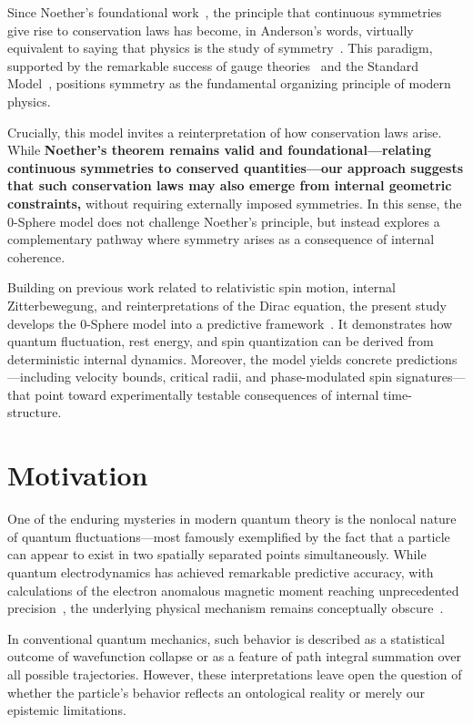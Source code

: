\documentclass[%
 reprint,
 amsmath,amssymb,
 aps,
]{revtex4-1}
\numberwithin{equation}{section}%
\begin{document}
Since Noether's foundational work~\cite{noether1918}, the principle that continuous symmetries give rise to conservation laws has become, in Anderson's words, virtually equivalent to saying that physics is the study of symmetry~\cite{anderson1972}. This paradigm, supported by the remarkable success of gauge theories~\cite{weinberg1996} and the Standard Model~\cite{gross1996}, positions symmetry as the fundamental organizing principle of modern physics.

Crucially, this model invites a reinterpretation of how conservation laws arise. While \textbf{Noether’s theorem remains valid and foundational—relating continuous symmetries to conserved quantities—our approach suggests that such conservation laws may also emerge from internal geometric constraints,} without requiring externally imposed symmetries. In this sense, the 0-Sphere model does not challenge Noether’s principle, but instead explores a complementary pathway where symmetry arises as a consequence of internal coherence.

Building on previous work related to relativistic spin motion, internal Zitterbewegung, and reinterpretations of the Dirac equation, the present study develops the 0-Sphere model into a predictive framework~\cite{barut1981}. It demonstrates how quantum fluctuation, rest energy, and spin quantization can be derived from deterministic internal dynamics. Moreover, the model yields concrete predictions—including velocity bounds, critical radii, and phase-modulated spin signatures—that point toward experimentally testable consequences of internal time-structure.


\section{Motivation}

One of the enduring mysteries in modern quantum theory is the nonlocal nature of quantum fluctuations—most famously exemplified by the fact that a particle can appear to exist in two spatially separated points simultaneously. While quantum electrodynamics has achieved remarkable predictive accuracy, with calculations of the electron anomalous magnetic moment reaching unprecedented precision~\cite{aoyama2015}, the underlying physical mechanism remains conceptually obscure~\cite{ballentine1998}.

In conventional quantum mechanics, such behavior is described as a statistical outcome of wavefunction collapse or as a feature of path integral summation over all possible trajectories. However, these interpretations leave open the question of whether the particle's behavior reflects an ontological reality or merely our epistemic limitations.
\end{document}

